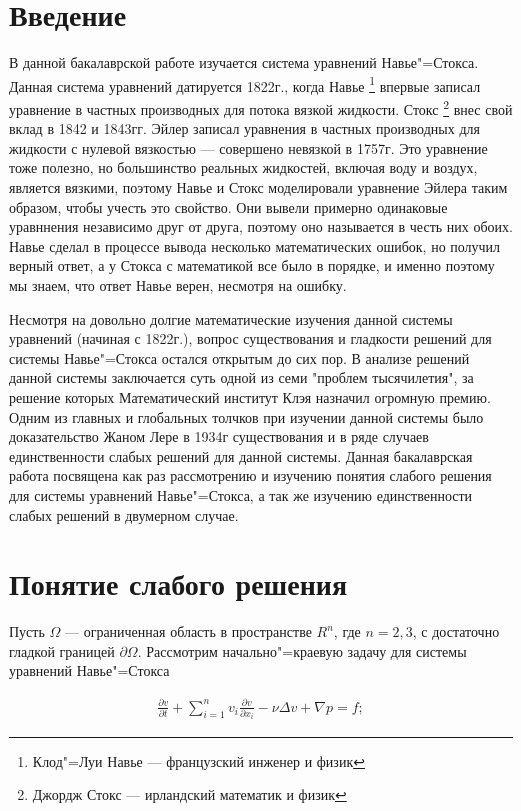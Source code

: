 \section*{Введение}
В данной бакалаврской работе изучается система уравнений Навье"=Стокса. Данная система уравнений датируется 1822г., когда 
Навье \footnote{Клод"=Луи Навье --- французский инженер и физик} впервые записал уравнение в частных производных для потока 
вязкой жидкости. Стокс \footnote{Джордж Стокс --- ирландский математик и физик} внес свой вклад в 1842 и 1843гг. Эйлер 
записал уравнения в частных производных для жидкости с нулевой вязкостью --- совершено невязкой в 1757г. Это уравнение 
тоже полезно, но большинство реальных жидкостей, включая воду и воздух, является вязкими, поэтому Навье и Стокс 
моделировали уравнение Эйлера таким образом, чтобы учесть это свойство. Они вывели примерно одинаковые уравннения независимо
друг от друга, поэтому оно называется в честь них обоих. Навье сделал в процессе вывода несколько математических ошибок, но
получил верный ответ, а у Стокса с математикой все было в порядке, и именно поэтому мы знаем, что ответ Навье верен, несмотря 
на ошибку.

Несмотря на довольно долгие математические изучения данной системы уравнений (начиная с 1822г.), вопрос существования и 
гладкости решений для системы Навье"=Стокса остался открытым до сих пор. В анализе решений данной системы заключается суть 
одной из семи "проблем тысячилетия", за решение которых Математический институт Клэя назначил огромную премию. Одним из 
главных и глобальных толчков при изучении данной системы было доказательство Жаном Лере в 1934г существования и в ряде 
случаев единственности слабых решений для данной системы. Данная бакалаврская работа посвящена как раз рассмотрению и
изучению понятия слабого решения для системы уравнений Навье"=Стокса, а так же изучению единственности слабых решений 
в двумерном случае.
\clearpage

\section {Понятие слабого решения}
Пусть $\Omega$ --- ограниченная область в пространстве $R^n$, где $n=2, 3$, с достаточно гладкой границей $\partial\Omega$.
Рассмотрим начально"=краевую задачу для системы уравнений Навье"=Стокса

\begin{equation}\label{eq:5.1}
    \begin{gathered}
        \frac{\partial v}{\partial t}+\sum_{i=1}^nv_i\frac{\partial v}{\partial x_i}-\nu\Delta v+\nabla p=f;
    \end{gathered}
\end{equation}

